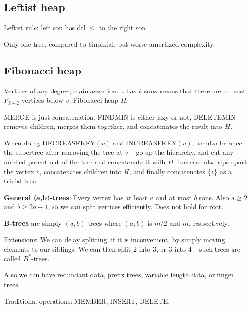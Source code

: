 \subsection{Leftist heap}


Leftist rule: left son has dtl $≤$ to the right son.

Only one tree, compared to binomial, but worse amortized complexity.

\subsection{Fibonacci heap}

Vertices of any degree, main assertion: $v$ has $k$ sons means that there are
at least $F_{k+2}$ vertices below $v$. Fibonacci heap $H$.

MERGE is just concatenation. FINDMIN is either lazy or not, DELETEMIN removes
children, merges them together, and concatenates the result into $H$.

When doing DECREASEKEY$(v)$ and INCREASEKEY$(v)$, we also balance the
supertree after removing the tree at $v$ -- go up the hierarchy, and
cut any marked parent out of the tree and concatenate it with
$H$. Increase also rips apart the vertex $v$, concatenates children
into $H$, and finally concatenates $\{v\}$ as a trivial tree.



{\bf General (a,b)-trees}: Every vertex has at least $a$ and at most $b$ sons. Also $a ≥ 2$ and $b ≥ 2a -1$,
so we can split vertices efficiently. Does not hold for root.


{\bf B-trees} are simply $(a,b)$ trees where $(a,b)$ is $m/2$ and $m$, respectively.

Extensions: We can delay splitting, if it is inconvenient, by simply moving elements to our siblings.
We can then split 2 into 3, or 3 into 4 -- such trees are called $B^*$-trees.

Also we can have redundant data, prefix trees, variable length data, or finger trees.


Traditional operations: MEMBER, INSERT, DELETE.


